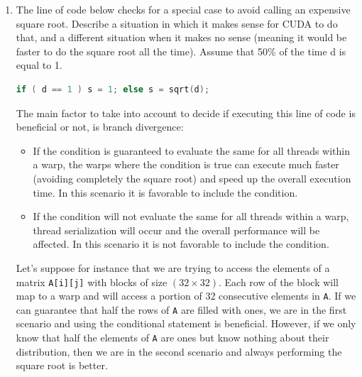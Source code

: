 \documentclass{article}
\begin{document}
\begin{enumerate}[1.]
    \item The line of code below checks for a special case to avoid calling an expensive square root.
    Describe a situation in which it makes sense for CUDA to do that, and a different situation when
    it makes no sense (meaning it would be faster to do the square root all the time). Assume that
    50\% of the time d is equal to 1.
\begin{lstlisting}[language=C]
if ( d == 1 ) s = 1; else s = sqrt(d);
\end{lstlisting}
    The main factor to take into account to decide if executing this line of code is beneficial or not, is branch divergence:
    \begin{itemize}
        \item If the condition is guaranteed to evaluate the same for all threads within a warp, the warps where the condition is true can execute much faster (avoiding completely the square root) and speed up the overall execution time. In this scenario it is favorable to include the condition.
        \item If the condition will not evaluate the same for all threads within a warp, thread serialization will occur and the overall performance will be affected. In this scenario it is not favorable to include the condition.
    \end{itemize}
    Let's suppose for instance that we are trying to access the elements of a matrix \texttt{A[i][j]} with blocks of size $(32 \times 32)$. Each row of the block will map to a warp and will access a portion of 32 consecutive elements in \texttt{A}. If we can guarantee that half the rows of \texttt{A} are filled with ones, we are in the first scenario and using the conditional statement is beneficial. However, if we only know that half the elements of \texttt{A} are ones but know nothing about their distribution, then we are in the second scenario and always performing the square root is better.


\end{enumerate}
\end{document}

